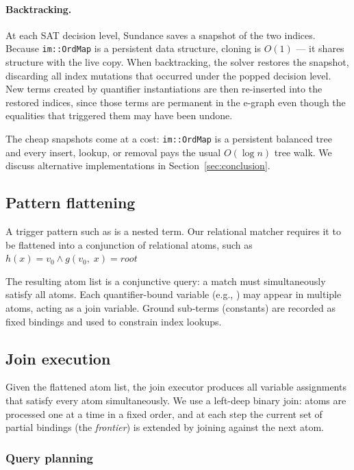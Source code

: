 \paragraph{Backtracking.} At each SAT decision level, Sundance saves a snapshot
of the two indices. Because \texttt{im::OrdMap} is a persistent data structure,
cloning is $O(1)$ --- it shares structure with the live copy. When backtracking, the
solver restores the snapshot, discarding all index mutations that occurred under
the popped decision level. New terms created by quantifier instantiations are
then re-inserted into the restored indices, since those terms are
permanent in the e-graph even though the equalities that triggered them may have
been undone.

The cheap snapshots come at a cost: \texttt{im::OrdMap} is a persistent balanced
tree and every insert, lookup, or removal pays the usual $O(\log n)$ tree walk. We 
discuss alternative implementations in Section~\ref{sec:conclusion}.

\subsection{Pattern flattening}
\label{sec:flattening}

A trigger pattern such as  is a nested term. Our relational
matcher requires it to be flattened into a conjunction of relational atoms, such 
as $h(x) = v_0  \wedge  g(v_0,\; x) = root$

The resulting atom list is a conjunctive query: a match must simultaneously
satisfy all atoms. Each quantifier-bound variable (e.g., ) may appear in
multiple atoms, acting as a join variable. Ground sub-terms (constants) are
recorded as fixed bindings and used to constrain index lookups.

\subsection{Join execution}
\label{sec:join}

Given the flattened atom list, the join executor produces all variable
assignments that satisfy every atom simultaneously. We use a left-deep binary
join: atoms are processed one at a time in a fixed order, and at each step the
current set of partial bindings (the \emph{frontier}) is extended by joining
against the next atom.

\subsubsection{Query planning}

